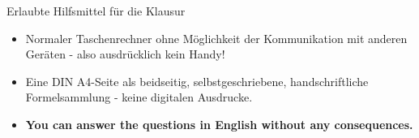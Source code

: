 \documentclass[a4paper, 9pt]{scrartcl}\usepackage[]{graphicx}\usepackage[]{xcolor}
\begin{document}
\maketitle
\thispagestyle{empty}
\clearpage

\begin{graybox}{Erlaubte Hilfsmittel f{\"u}r die Klausur}
  \vspace{1Ex}
  \begin{itemize}
  \item Normaler Taschenrechner ohne M{\"o}glichkeit der Kommunikation mit anderen
    Ger{\"a}ten - also ausdr{\"u}cklich kein Handy!
  \item Eine DIN A4-Seite als beidseitig, selbstgeschriebene,
    handschriftliche Formelsammlung - keine digitalen Ausdrucke. 
  \item \textbf{You can answer the questions in English without any consequences.}  
  \end{itemize}
\end{graybox}
\vfill
\end{document}
